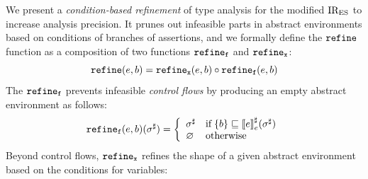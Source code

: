 We present a \textit{condition-based refinement} of type analysis for the
modified ${\text{IR}_\text{ES}}$ to increase analysis precision.  It prunes out infeasible parts
in abstract environments based on conditions of branches of assertions, and we
formally define the $\texttt{refine}$ function as a composition of two functions
$\texttt{refine}_{\texttt{f}}$ and $\texttt{refine}_{\texttt{x}}$:
\[
  \texttt{refine}(e, b) =
  \texttt{refine}_{\texttt{x}}(e, b) \circ \texttt{refine}_{\texttt{f}}(e, b)
\]
The $\texttt{refine}_{\texttt{f}}$ prevents infeasible \textit{control flows} by producing an
empty abstract environment as follows:
\[
  \texttt{refine}_{\texttt{f}}(e, b)({\sigma}^\sharp) = \left\{
    \begin{array}{ll}
      {\sigma}^\sharp & \text{if} \; \{ b \} \sqsubseteq {\llbracket{e}\rrbracket}^\sharp_e({\sigma}^\sharp)\\
      \varnothing & \text{otherwise}\\
    \end{array}
  \right.
\]
Beyond control flows, $\texttt{refine}_{\texttt{x}}$ refines the shape of a given abstract
environment based on the conditions for variables:
